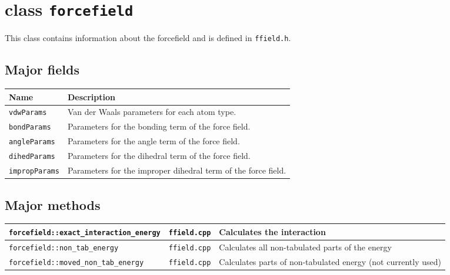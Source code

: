 \documentclass{article}      %
\begin{document}
\section{class \texttt{forcefield}}
This class contains information about the forcefield and is defined in \verb+ffield.h+.



\subsection{Major fields}
\begin{tabular}{|p{5cm}|p{11cm}|}
\hline
Name &  Description \\
\hline
\verb+vdwParams+ & Van der Waals parameters for each atom type. \\
\hline
\verb+bondParams+ & Parameters for the bonding term of the force field.  \\
\hline
\verb+angleParams+ & Parameters for the angle term of the force field.  \\
\hline
\verb+dihedParams+ & Parameters for the dihedral term of the force field.  \\
\hline
\verb+impropParams+ & Parameters for the improper dihedral term of the force field.  \\
\hline
\end{tabular}


\subsection{Major methods}

\begin{tabular}{|p{7cm}|p{3cm}|p{6cm}|}
\verb+forcefield::exact_interaction_energy+ & \verb+ffield.cpp+ & Calculates the interaction  \\
\hline
\verb+forcefield::non_tab_energy+ & \verb+ffield.cpp+ &Calculates all non-tabulated parts of the energy \\
\hline
\verb+forcefield::moved_non_tab_energy+ & \verb+ffield.cpp+ &Calculates parts of non-tabulated energy (not currently used) \\
\hline

\end{tabular}
\end{document}
